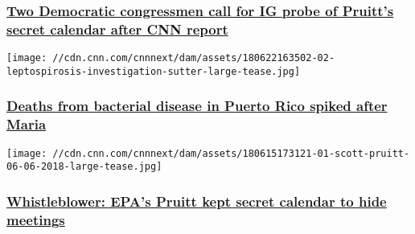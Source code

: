 \hypertarget{two-democratic-congressmen-call-for-ig-probe-of-pruitts-secret-calendar-after-cnn-report}{%
\subsubsection{\texorpdfstring{\href{/2018/07/05/politics/pruitt-epa-beyer-lieu-inspector-general/index.html}{Two
Democratic congressmen call for IG probe of Pruitt's secret calendar
after CNN
report}}{Two Democratic congressmen call for IG probe of Pruitt's secret calendar after CNN report}}\label{two-democratic-congressmen-call-for-ig-probe-of-pruitts-secret-calendar-after-cnn-report}}

\href{/2018/07/03/health/sutter-leptospirosis-outbreak-puerto-rico-invs/index.html}{}

\texttt{[image: //cdn.cnn.com/cnnnext/dam/assets/180622163502-02-leptospirosis-investigation-sutter-large-tease.jpg]}

\hypertarget{deaths-from-bacterial-disease-in-puerto-rico-spiked-after-maria-}{%
\subsubsection{\texorpdfstring{\href{/2018/07/03/health/sutter-leptospirosis-outbreak-puerto-rico-invs/index.html}{Deaths
from bacterial disease in Puerto Rico spiked after Maria
}}{Deaths from bacterial disease in Puerto Rico spiked after Maria }}\label{deaths-from-bacterial-disease-in-puerto-rico-spiked-after-maria-}}

\href{/2018/07/02/politics/scott-pruitt-whistleblower-secret-calendar/index.html}{}

\texttt{[image: //cdn.cnn.com/cnnnext/dam/assets/180615173121-01-scott-pruitt-06-06-2018-large-tease.jpg]}

\hypertarget{whistleblower-epas-pruitt-kept-secret-calendar-to-hide-meetings-1}{%
\subsubsection{\texorpdfstring{\href{/2018/07/02/politics/scott-pruitt-whistleblower-secret-calendar/index.html}{Whistleblower:
EPA's Pruitt kept secret calendar to hide
meetings}}{Whistleblower: EPA's Pruitt kept secret calendar to hide meetings}}\label{whistleblower-epas-pruitt-kept-secret-calendar-to-hide-meetings-1}}

\href{/2018/06/29/us/teenage-asylum-seeker-migrant-describes-months-in-detention-invs/index.html}{}

